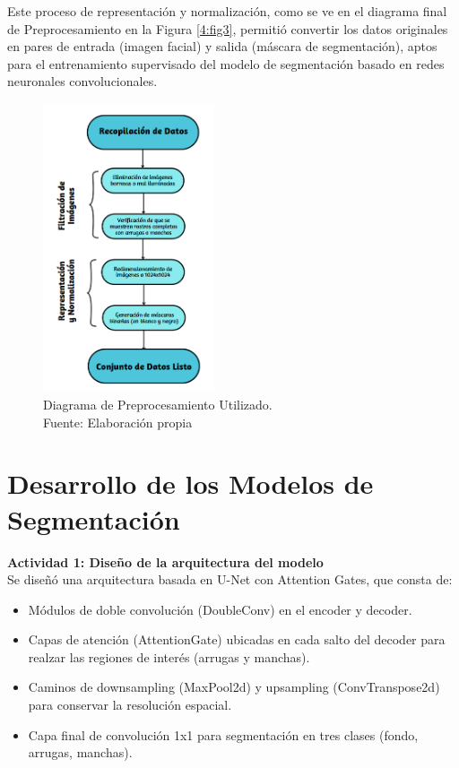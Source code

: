 Este proceso de representación y normalización, como se ve en el diagrama final de Preprocesamiento en la Figura \ref{4:fig3}, permitió convertir los datos originales en pares de entrada (imagen facial) y salida (máscara de segmentación), aptos para el entrenamiento supervisado del modelo de segmentación basado en redes neuronales convolucionales.

\begin{figure}[h]
	\begin{center}
		\includegraphics[width=0.45\textwidth]{4/figures/diagrama final prepo.png}
		\caption[Diagrama de Preprocesamiento Utilizado]{Diagrama de Preprocesamiento Utilizado.\\
		Fuente: Elaboración propia}
		\label{4:fig2}
	\end{center}
\end{figure}

\section{Desarrollo de los Modelos de Segmentación}

\textbf{Actividad 1: Diseño de la arquitectura del modelo}\\
Se diseñó una arquitectura basada en U-Net con Attention Gates, que consta de:
\begin{itemize}
  \item Módulos de doble convolución (DoubleConv) en el encoder y decoder.  
  \item Capas de atención (AttentionGate) ubicadas en cada salto del decoder para realzar las regiones de interés (arrugas y manchas).  
  \item Caminos de downsampling (MaxPool2d) y upsampling (ConvTranspose2d) para conservar la resolución espacial.  
  \item Capa final de convolución 1x1 para segmentación en tres clases (fondo, arrugas, manchas).  
\end{itemize}

